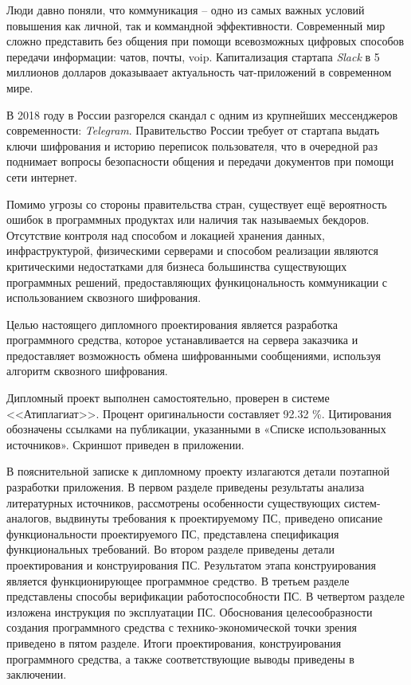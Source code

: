 
Люди давно поняли, что коммуникация -- одно из самых важных условий повышения как личной, так и коммандной эффективности. Современный мир сложно представить без общения при помощи всевозможных цифровых способов передачи информации: чатов, почты, \gls{voip}. Капитализация стартапа \textit{Slack} в 5 миллионов долларов\cite{slack:capitalization} доказываает актуальность чат-приложений в современном мире.

В 2018 году в России разгорелся скандал с одним из крупнейших мессенджеров современности: \textit{Telegram}. Правительство России требует от стартапа выдать ключи шифрования и историю переписок пользователя, что в очередной раз поднимает вопросы безопасности общения и передачи документов при помощи сети интернет\cite{telegram:vs:rkn}.

Помимо угрозы со стороны правительства стран, существует ещё вероятность ошибок в программных продуктах или наличия так называемых бекдоров. Отсутствие контроля над способом и локацией хранения данных, инфраструктурой, физическими серверами и способом реализации являются критическими недостатками для бизнеса большинства существующих программных решений, предоставляющих функицональность коммуникации с использованием сквозного шифрования.

Целью настоящего дипломного проектирования является разработка программного средства, которое устанавливается на сервера заказчика и предоставляет возможность обмена шифрованными сообщениями, используя алгоритм сквозного шифрования.

Дипломный проект выполнен самостоятельно, проверен в системе <<Атиплагиат>>. Процент оригинальности составляет 92.32 \%. Цитирования обозначены ссылками на публикации, указанными в «Списке использованных источников».
Скриншот приведен в приложении.

В пояснительной записке к дипломному проекту излагаются детали поэтапной разработки приложения. В первом разделе приведены результаты анализа литературных источников, рассмотрены особенности существующих систем-аналогов, выдвинуты требования к проектируемому ПС, приведено описание функциональности проектируемого ПС, представлена спецификация функциональных требований. Во втором разделе приведены детали проектирования и конструирования ПС. Результатом этапа конструирования является функционирующее программное средство. В третьем разделе представлены способы верификации работоспособности ПС. В четвертом разделе изложена инструкция по эксплуатации ПС. Обоснования целесообразности создания программного средства с технико-экономической точки зрения приведено в пятом разделе. Итоги проектирования, конструирования программного средства, а также соответствующие выводы приведены в заключении.